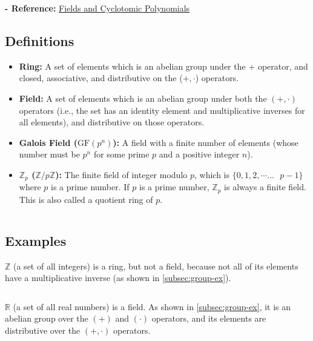 \textbf{- Reference:} 
\href{https://e.math.cornell.edu/people/belk/numbertheory/CyclotomicPolynomials.pdf}{Fields and Cyclotomic Polynomials}~\cite{cyclotomic-polynomial}

\subsection{Definitions}
\label{subsec:field-def}

\begin{tcolorbox}[title={\textbf{\tboxdef{\ref*{subsec:field-def}} Field Definitions}}]
\begin{itemize}
\item \textbf{Ring:} A set of elements which is an abelian group under the + operator, and closed, associative, and distributive on the ($+, \cdot$) operators. 
\item \textbf{Field:} A set of elements which is an abelian group under both the $(+, \cdot)$ operators (i.e., the set has an identity element and multiplicative inverses for all elements), and distributive on those operators.
\item \textbf{Galois Field ($\text{GF}(p^n)$):} A field with a finite number of elements (whose number must be $p^n$ for some prime $p$ and a positive integer $n$).
\item \textbf{$\mathbb{Z}_p$ ($\mathbb{Z}/p\mathbb{Z}$):} The finite field of integer modulo $p$, which is $\{0, 1, 2, \cdots... \text{ } p - 1\}$ where $p$ is a prime number. If $p$ is a prime number, $\mathbb{Z}_p$ is always a finite field. This is also called a quotient ring of $p$.
\end{itemize}
\end{tcolorbox}
$ $

\subsection{Examples}
\label{subsec:field-ex}

$\mathbb{Z}$ (a set of all integers) is a ring, but not a field, because not all of its elements have a multiplicative inverse (as shown in \autoref{subsec:group-ex}). 

$ $

\noindent $\mathbb{R}$ (a set of all real numbers) is a field. As shown in \autoref{subsec:group-ex}, it is an abelian group over the $(+)$ and $(\cdot)$ operators, and its elements are distributive over the $(+, \cdot)$ operators.


$ $

